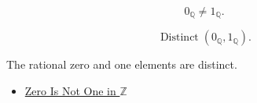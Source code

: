 \begin{remark*}
\[
0_{\mathbb{Q}}\ne1_{\mathbb{Q}}.
\]
\end{remark*}

\begin{remark*}
\[
\operatorname{Distinct}(0_{\mathbb{Q}},1_{\mathbb{Q}}).
\]
\end{remark*}

\begin{remark*}[Interpretation]
The rational zero and one elements are distinct.
\end{remark*}

\begin{dependencies}
\begin{itemize}
  \item \hyperref[thm:zero-not-one-in-z]{Zero Is Not One in $\mathbb{Z}$}
\end{itemize}
\end{dependencies}
